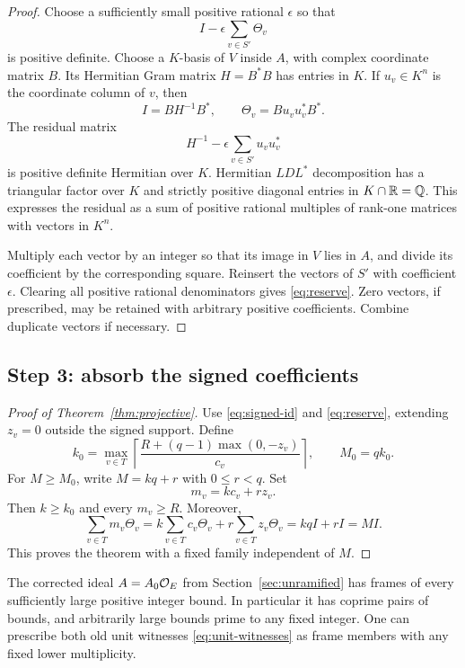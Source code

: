 \begin{proof}
Choose a sufficiently small positive rational $\epsilon$ so that
\[
 I-\epsilon\sum_{v\in S'}\Theta_v
\]
is positive definite. Choose a $K$-basis of $V$ inside $A$, with complex coordinate matrix $B$. Its Hermitian Gram matrix $H=B^*B$ has entries in $K$. If $u_v\in K^n$ is the coordinate column of $v$, then
\[
 I=BH^{-1}B^*,\qquad \Theta_v=Bu_vu_v^*B^*.
\]
The residual matrix
\[
 H^{-1}-\epsilon\sum_{v\in S'}u_vu_v^*
\]
is positive definite Hermitian over $K$. Hermitian $LDL^*$ decomposition has a triangular factor over $K$ and strictly positive diagonal entries in $K\cap\mathbb R=\mathbb Q$. This expresses the residual as a sum of positive rational multiples of rank-one matrices with vectors in $K^n$.

Multiply each vector by an integer so that its image in $V$ lies in $A$, and divide its coefficient by the corresponding square. Reinsert the vectors of $S'$ with coefficient $\epsilon$. Clearing all positive rational denominators gives \eqref{eq:reserve}. Zero vectors, if prescribed, may be retained with arbitrary positive coefficients. Combine duplicate vectors if necessary.
\end{proof}

\subsection{Step 3: absorb the signed coefficients}

\begin{proof}[Proof of Theorem~\ref{thm:projective}]
Use \eqref{eq:signed-id} and \eqref{eq:reserve}, extending $z_v=0$ outside the signed support. Define
\begin{equation}\label{eq:explicit-threshold}
 k_0=\max_{v\in T}
 \left\lceil\frac{R+(q-1)\max(0,-z_v)}{c_v}\right\rceil,
 \qquad M_0=qk_0.
\end{equation}
For $M\ge M_0$, write $M=kq+r$ with $0\le r<q$. Set
\[
 m_v=kc_v+rz_v.
\]
Then $k\ge k_0$ and every $m_v\ge R$. Moreover,
\[
 \sum_{v\in T}m_v\Theta_v
 =k\sum_{v\in T}c_v\Theta_v+r\sum_{v\in T}z_v\Theta_v
 =kqI+rI=MI.
\]
This proves the theorem with a fixed family independent of $M$.
\end{proof}

\begin{corollary}
The corrected ideal $A=A_0\mathcal O_E$ from Section~\ref{sec:unramified} has frames of every sufficiently large positive integer bound. In particular it has coprime pairs of bounds, and arbitrarily large bounds prime to any fixed integer. One can prescribe both old unit witnesses \eqref{eq:unit-witnesses} as frame members with any fixed lower multiplicity.
\end{corollary}

